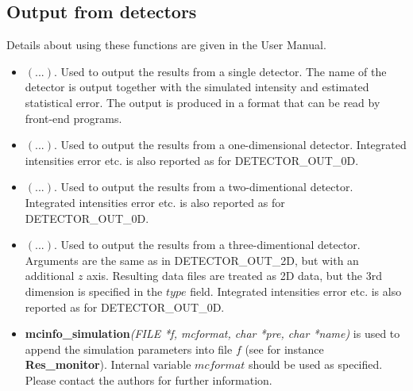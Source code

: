 \subsection{Output from detectors}
Details about using these functions are given in the \MCS User Manual.
\begin{itemize}
\item {}$(...)$. Used to output the results from a
  single detector. The name of the detector is output together
  with the simulated intensity and estimated statistical error. The
  output is produced in a format that can be read by \MCS front-end
  programs.
\item {}$(...)$. Used to output the results from a
  one-dimensional detector. Integrated intensities error etc. is also
  reported as for DETECTOR\_OUT\_0D.
\item {}$(...)$. Used to output the results from a
  two-dimentional detector. Integrated intensities error etc. is also
  reported as for DETECTOR\_OUT\_0D.
\item {}$(...)$. Used to output
  the results from a three-dimentional detector. Arguments are the same as
  in DETECTOR\_OUT\_2D, but with an additional $z$ axis.
  Resulting data files are treated as 2D data, but the 3rd dimension is
  specified in the $type$ field. Integrated intensities error etc. is also
  reported as for DETECTOR\_OUT\_0D.
\item \textbf{mcinfo\_simulation}\textit{(FILE *f, mcformat,
  char *pre, char *name)} is used to append the simulation parameters into file $f$
  (see for instance \textbf{Res\_monitor}).
  Internal variable $mcformat$ should be used as specified.
  Please contact the authors for further information.
\end{itemize}

